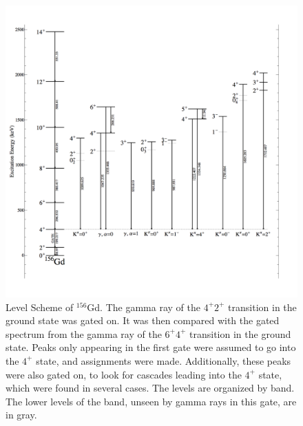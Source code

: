 \begin{figure}
    \centering
    \includegraphics[scale=0.28]{156GdTablesAndFigs/156Gd_4to2.png}
    \caption{Level Scheme of $^{156}$Gd. The gamma ray of the $4^+$\rightarrow$2^+$ transition in the ground state was gated on. It was then compared with the gated spectrum from the gamma ray of the $6^+$\rightarrow$4^+$ transition in the ground state. Peaks only appearing in the first gate were assumed to go into the $4^+$ state, and assignments were made. Additionally, these peaks were also gated on, to look for cascades leading into the $4^+$ state, which were found in several cases. The levels are organized by band. The lower levels of the band, unseen by gamma rays in this gate, are in gray.}
    \label{fig:156_4to2}
\end{figure}

